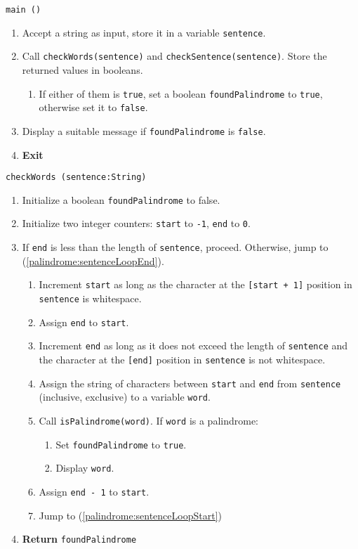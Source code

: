 \algorithm
{\tt main ()}
\begin{enumerate}
	\item	Accept a string as input, store it in a variable {\tt sentence}.
	\item	Call {\tt checkWords(sentence)} and {\tt checkSentence(sentence)}. Store the
			returned values in booleans.
	\begin{enumerate}
		\item	If either of them is {\tt true}, set a boolean {\tt foundPalindrome}
			to {\tt true}, otherwise set it to {\tt false}.
	\end{enumerate}
	\item	Display a suitable message if {\tt foundPalindrome} is {\tt false}.
	\item	{\bf Exit}
\end{enumerate}
\vspace{5mm}
{\tt checkWords (sentence:String)}
\begin{enumerate}
	\item	Initialize a boolean {\tt foundPalindrome} to false.
	\item	Initialize two integer counters: {\tt start} to {\tt -1}, {\tt end} to {\tt 0}.
	\item	If {\tt end} is less than the length of {\tt sentence}, proceed.
			Otherwise, jump to (\ref{palindrome:sentenceLoopEnd}). \label{palindrome:sentenceLoopStart}
	\begin{enumerate}
		\item	Increment {\tt start} as long as the character at the {\tt [start + 1]} position in
				{\tt sentence} is whitespace.
		\item	Assign {\tt end} to {\tt start}.
		\item	Increment {\tt end} as long as it does not exceed the length of {\tt sentence} and
				the character at the {\tt [end]} position in {\tt sentence} is not whitespace.
		\item	Assign the string of characters between {\tt start} and {\tt end} from {\tt sentence}
				(inclusive, exclusive) to a variable {\tt word}.
		\item	Call {\tt isPalindrome(word)}. If {\tt word} is a palindrome:
		\begin{enumerate}
			\item	Set {\tt foundPalindrome} to {\tt true}.
			\item	Display {\tt word}.
		\end{enumerate}
		\item	Assign {\tt end - 1} to {\tt start}.
		\item	Jump to (\ref{palindrome:sentenceLoopStart})
	\end{enumerate}
	\item	{\bf Return} {\tt foundPalindrome}\label{palindrome:sentenceLoopEnd}
\end{enumerate}
